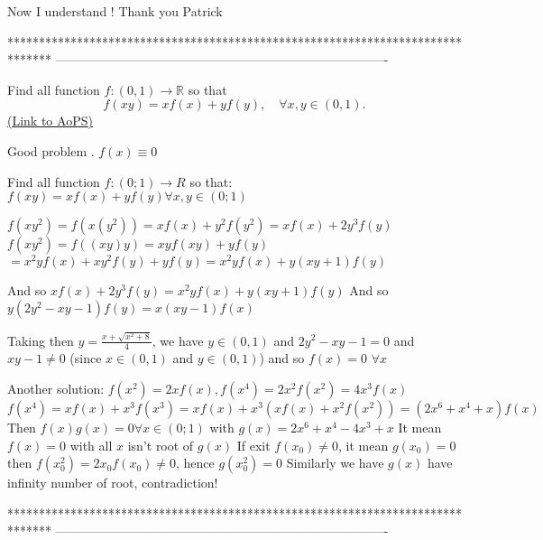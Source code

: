 \begin{mysolution}
	Now I understand ! Thank you Patrick   
\end{mysolution}
*******************************************************************************
-------------------------------------------------------------------------------

\begin{problem}
	Find all function $ f: (0,1)\rightarrow \mathbb R$ so that
\[ f(xy)=xf(x)+yf(y), \quad \forall x,y\in(0,1).\]
	\flushright \href{https://artofproblemsolving.com/community/c6h174248}{(Link to AoPS)}
\end{problem}



\begin{mysolution}
	Good problem .
$ f(x)\equiv 0$
\end{mysolution}



\begin{mysolution}
	\begin{tcolorbox}Find all function $ f: (0;1)\rightarrow R$ so that:
$ f(xy) = xf(x) + yf(y)\forall x,y\in(0;1)$\end{tcolorbox}

$ f(xy^2)=f(x(y^2))=xf(x)+y^2f(y^2)=xf(x)+2y^3f(y)$
$ f(xy^2)=f((xy)y)=xyf(xy)+yf(y)$ $ =x^2yf(x)+xy^2f(y)+yf(y)=x^2yf(x)+y(xy+1)f(y)$

And so $ xf(x)+2y^3f(y)=x^2yf(x)+y(xy+1)f(y)$
And so $ y(2y^2-xy-1)f(y)=x(xy-1)f(x)$

Taking then $ y=\frac{x+\sqrt{x^2+8}}{4}$, we have $ y\in(0,1)$ and $ 2y^2-xy-1=0$ and $ xy-1\neq 0$ (since $ x\in(0,1)$ and $ y\in(0,1)$) and so $ f(x)=0$ $ \forall x$
\end{mysolution}



\begin{mysolution}
	Another solution:
$ f(x^2)=2xf(x),f(x^4)=2x^2f(x^2)=4x^3f(x)$
$ f(x^4)=xf(x)+x^3f(x^3)=xf(x)+x^3(xf(x)+x^2f(x^2))=(2x^6+x^4+x)f(x)$
Then $ f(x)g(x)=0\forall x\in(0;1)$ with $ g(x)=2x^6+x^4-4x^3+x$
It mean $ f(x)=0$ with all $ x$ isn't root of $ g(x)$
If exit $ f(x_0)\neq 0$, it mean $ g(x_0)=0$ then $ f(x_0^2)=2x_0f(x_0)\neq 0$, hence $ g(x_0^2)=0$
Similarly we have $ g(x)$ have infinity number of root, contradiction!
\end{mysolution}
*******************************************************************************
-------------------------------------------------------------------------------

